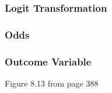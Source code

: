 \documentclass[handout]{beamer}
\newcommand{\blue}[1]{\textcolor{blue2}{#1}}
\begin{document}
\begin{frame}[fragile]
\frametitle{Logit Transformation}

%
%

\end{frame}


\begin{frame}[fragile]
\frametitle{Odds}

%
%
%
%
%
%
%

\end{frame}


\begin{frame}[fragile]
\frametitle{Outcome Variable}
Figure 8.13 from page 388

\vspace{6cm}

\end{frame}
\end{document}
